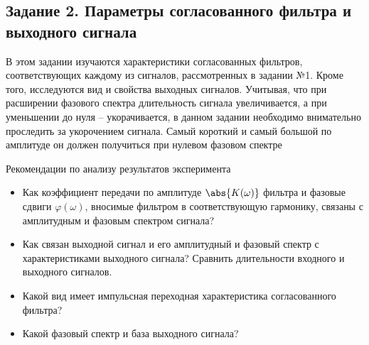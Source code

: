 \subsection{Задание 2. Параметры согласованного фильтра и выходного сигнала}
В этом задании изучаются характеристики согласованных фильтров,
соответствующих каждому из сигналов, рассмотренных в задании №1. Кроме
того, исследуются вид и свойства выходных сигналов. Учитывая, что при
расширении фазового спектра длительность сигнала увеличивается, а при
уменьшении до нуля – укорачивается, в данном задании необходимо
внимательно проследить за укорочением сигнала. Самый короткий и самый
большой по амплитуде он должен получиться при нулевом фазовом спектре


Рекомендации по анализу результатов эксперимента
\begin{itemize}
    \item Как коэффициент передачи по амплитуде $\abs{K(\omega)}$ фильтра и фазовые
    сдвиги $\varphi(\omega)$, вносимые фильтром в соответствующую гармонику,
    связаны с амплитудным и фазовым спектром сигнала?
    \item Как связан выходной сигнал и его амплитудный и фазовый спектр с
    характеристиками выходного сигнала? Сравнить длительности
    входного и выходного сигналов.
    \item Какой вид имеет импульсная переходная характеристика
    согласованного фильтра?
    \item Какой фазовый спектр и база выходного сигнала? 
\end{itemize}




